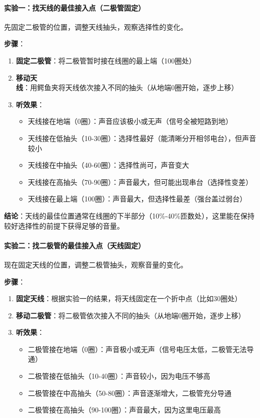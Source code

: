 \documentclass[12pt,UTF8]{ctexbook}
\begin{document}
\paragraph{实验一：找天线的最佳接入点（二极管固定）}

先固定二极管的位置，调整天线抽头，观察选择性的变化。

\textbf{步骤}：
\begin{enumerate}[leftmargin=3.5em]
	\item \textbf{固定二极管}：将二极管暂时接在线圈的最上端（100圈处）
	\item \textbf{移动天线}：用鳄鱼夹将天线依次接入不同的抽头（从地端0圈开始，逐步上移）
	\item \textbf{听效果}：
	\begin{itemize}[leftmargin=3.5em]
		\item 天线接在地端（0圈）：声音应该极小或无声（信号全被短路到地）
		\item 天线接在低抽头（10-30圈）：选择性最好（能清晰分开相邻电台），但声音较小
		\item 天线接在中抽头（40-60圈）：选择性尚可，声音变大
		\item 天线接在高抽头（70-90圈）：声音最大，但可能出现串台（选择性变差）
		\item 天线接在最上端（100圈）：声音最大，但选择性最差（强台盖过弱台）
	\end{itemize}
\end{enumerate}

\textbf{结论}：天线的最佳位置通常在线圈的下半部分（10\%-40\%匝数处），这里能在保持较好选择性的前提下获得足够的音量。

\paragraph{实验二：找二极管的最佳接入点（天线固定）}

现在固定天线的位置，调整二极管抽头，观察音量的变化。

\textbf{步骤}：
\begin{enumerate}[leftmargin=3.5em]
	\item \textbf{固定天线}：根据实验一的结果，将天线固定在一个折中点（比如30圈处）
	\item \textbf{移动二极管}：将二极管依次接入不同的抽头（从地端0圈开始，逐步上移）
	\item \textbf{听效果}：
	\begin{itemize}[leftmargin=3.5em]
		\item 二极管接在地端（0圈）：声音极小或无声（信号电压太低，二极管无法导通）
		\item 二极管接在低抽头（10-40圈）：声音较小，因为电压不够高
		\item 二极管接在中高抽头（50-80圈）：声音逐渐增大，二极管充分导通
		\item 二极管接在高抽头（90-100圈）：声音最大，因为这里电压最高
	\end{itemize}
\end{enumerate}
\end{document}
